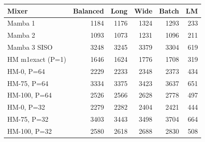 \begin{tabular}{l r r r r r }
\toprule
Mixer & Balanced & Long & Wide & Batch & LM \\
\midrule
Mamba 1 & 1184 & 1176 & 1324 & 1293 & 233 \\
Mamba 2 & 1093 & 1073 & 1231 & 1096 & 211 \\
Mamba 3 SISO & 3248 & 3245 & 3379 & 3304 & 619 \\
\midrule
HM m1exact (P=1) & 1646 & 1624 & 1776 & 1708 & 319 \\
HM-0, P=64 & 2229 & 2233 & 2348 & 2373 & 434 \\
HM-75, P=64 & 3334 & 3375 & 3423 & 3637 & 651 \\
HM-100, P=64 & 2526 & 2566 & 2628 & 2778 & 497 \\
HM-0, P=32 & 2279 & 2282 & 2404 & 2421 & 444 \\
HM-75, P=32 & 3403 & 3443 & 3498 & 3704 & 664 \\
HM-100, P=32 & 2580 & 2618 & 2688 & 2830 & 508 \\
\bottomrule
\end{tabular}
